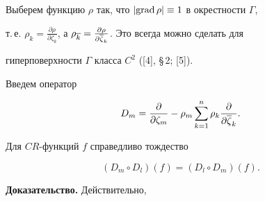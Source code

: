Выберем функцию $\rho$ так, что $|\text{grad}\,\rho|\equiv1$  в окрестности $\Gamma$,


т.\,е. $\rho_k=\frac{\partial\rho}{\partial\zeta_k}$, а $\rho_{\ovl k}=


\frac{\partial\rho}{\partial\ovl\zeta_k}$. Это всегда можно сделать для


гиперповерхности $\Gamma$ класса $C^2$ ([4], \S\,2; [5]).


Введем оператор


\begin{equation}


D_m=\frac\partial{\partial\zeta_m}-\rho_m\sum_{k=1}^n\rho_k\frac\partial


{\partial\ovl\zeta_k}.


\end{equation}





\begin{lem}


Для $CR$-функций  $f$ справедливо тождество


$$


(D_m\circ D_l)(f)=(D_l\circ D_m)(f).


$$


\end{lem}





{\bf Доказательство.} Действительно,


